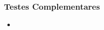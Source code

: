 \begin{frame}
	\frametitle{Testes Complementares}
	\begin{itemize}
		\item 
	\end{itemize}
\end{frame}